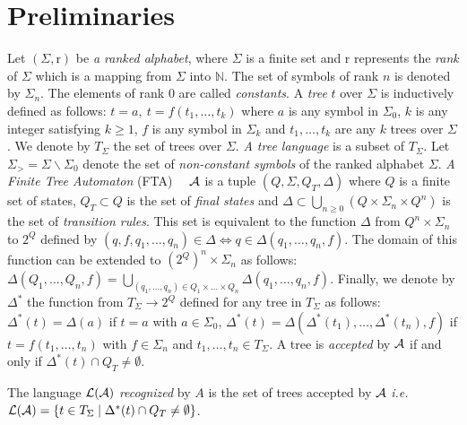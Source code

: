 \documentclass{llncs}
\begin{document}
\section{Preliminaries}\label{sec prelim}
    Let $(\Sigma,\mathrm{r})$ be  \emph{a ranked alphabet}, where $\Sigma$ is a finite set and $\mathrm{r}$ represents the  \emph{rank} of $\Sigma$ which is a mapping from $\Sigma$ into $\mathbb{N}$. The set of symbols of rank $n$ is denoted by $\Sigma_{n}$. The elements of rank $0$ are called  \emph{constants}. A \emph{tree} $t$ over   $\Sigma$ is inductively defined as follows: $t=a,~ t=f(t_1,\dots,t_k)$ where $a$ is any symbol in  $\Sigma_0$, $k$ is any integer satisfying $k\geq 1$, $f$ is any symbol in $\Sigma_k$ and $t_1,\dots,t_k$ are any $k$ trees over $\Sigma$. We denote by $T_{\Sigma}$ the set of trees over $\Sigma$.  \emph{A tree language} is a subset of $T_{\Sigma}$. Let $\Sigma_{>}=\Sigma\backslash \Sigma_0$ denote the set of  \emph{non-constant symbols} of the ranked alphabet $\Sigma$. \emph{A Finite Tree Automaton} (FTA)~~\cite{automate1,automate2} ${\cal A}$ is a tuple $( Q, \Sigma, Q_{T},\Delta )$ where $Q$ is a finite set of states, $Q_T \subset Q$ is the set of \emph{final states} 
and  $\Delta\subset\bigcup_{n\geq 0}(Q \times \Sigma_{n}\times Q^n)$ is the set of  \emph{transition rules}. This set is equivalent to the function $\Delta$ from $Q^n \times \Sigma_n$ to $2^Q$ defined  by $(q,f,q_1,\dots,q_n)\in \Delta\Leftrightarrow q\in \Delta(q_1,\dots,q_n,f)$. The domain of this function can be extended to $(2^Q)^n \times \Sigma_n$
as follows: $\Delta(Q_1,\dots,Q_n,f)=\bigcup_{(q_1,\dots,q_n)\in Q_1\times\dots\times Q_n} \Delta(q_1,\dots,q_n,f)$.  Finally, we denote by $\Delta^*$ the function from  $T_{\Sigma}\rightarrow 2^Q$  defined for any tree in $T_{\Sigma}$ as follows: 
  $\Delta^*(t)= \Delta(a)$ if  $t=a$ with $a\in \Sigma_0$, $\Delta^*(t)=\Delta(\Delta^*(t_1),\dots,\Delta^*(t_n),f)$
   if $t=f(t_1,\dots,t_n)$ with $f\in {\Sigma}_n$ and $t_1,\ldots,t_n\in T_{\Sigma}$. 
  A tree is \emph{accepted} by ${\cal A}$ if and only if $\Delta^*(t)\cap Q_T\neq \emptyset$.   
 
  The language ${\cal L(A)}$ \emph{recognized} by $A$ is the set of trees accepted by ${\cal A}$  \emph{i.e.} ${\cal L(A)}=\{t\in T_{\Sigma}\mid \Delta^*(t)\cap Q_T\neq \emptyset\}$. 
\end{document}

